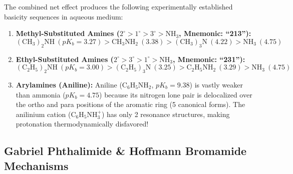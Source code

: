 \documentclass[10pt,a4paper]{article}
\begin{document}
\begin{formulabox}
The combined net effect produces the following experimentally established basicity sequences in aqueous medium:
\begin{enumerate}[leftmargin=*]
  \item \textbf{Methyl-Substituted Amines ($2^\circ > 1^\circ > 3^\circ > \mathrm{NH_3}$, Mnemonic: ``213''):}
  \begin{equation}
    \mathbf{\mathrm{(CH_3)_2NH}} \ (pK_b = 3.27) > \mathbf{\mathrm{CH_3NH_2}} \ (3.38) > \mathbf{\mathrm{(CH_3)_3N}} \ (4.22) > \mathbf{\mathrm{NH_3}} \ (4.75)
  \end{equation}
  \item \textbf{Ethyl-Substituted Amines ($2^\circ > 3^\circ > 1^\circ > \mathrm{NH_3}$, Mnemonic: ``231''):}
  \begin{equation}
    \mathbf{\mathrm{(C_2H_5)_2NH}} \ (pK_b = 3.00) > \mathbf{\mathrm{(C_2H_5)_3N}} \ (3.25) > \mathbf{\mathrm{C_2H_5NH_2}} \ (3.29) > \mathbf{\mathrm{NH_3}} \ (4.75)
  \end{equation}
  \item \textbf{Arylamines (Aniline):}
  Aniline ($\mathrm{C_6H_5NH_2}$, $pK_b = 9.38$) is vastly weaker than ammonia ($pK_b = 4.75$) because its nitrogen lone pair is delocalized over the ortho and para positions of the aromatic ring (5 canonical forms). The anilinium cation ($\mathrm{C_6H_5NH_3^+}$) has only 2 resonance structures, making protonation thermodynamically disfavored!
\end{enumerate}
\end{formulabox}

\subsection{Gabriel Phthalimide \& Hoffmann Bromamide Mechanisms}
\end{document}
